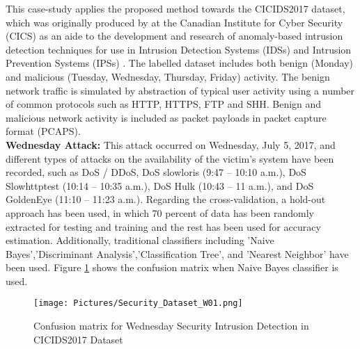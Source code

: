 \documentclass{article}
\begin{document}
This case-study applies the proposed method towards the CICIDS2017 dataset, which was originally produced by \cite{securitydataset} at the Canadian Institute for Cyber Security (CICS) as an aide to the development and research of anomaly-based intrusion detection techniques for use in Intrusion Detection Systems (IDSs) and Intrusion Prevention Systems (IPSs) \cite{datasetanalysis}.
The labelled dataset includes both benign (Monday) and malicious (Tuesday, Wednesday, Thursday, Friday) activity. The benign network traffic is simulated by abstraction of typical user activity using a number of common protocols such as HTTP, HTTPS, FTP and SHH. Benign and malicious network activity is included as packet payloads in packet capture format (PCAPS).
\\
\textbf{Wednesday Attack:} This attack occurred on Wednesday, July 5, 2017, and different types of attacks on the availability of the victim's system have been recorded, such as DoS / DDoS, DoS slowloris (9:47 – 10:10 a.m.), DoS Slowhttptest (10:14 – 10:35 a.m.), DoS Hulk (10:43 – 11 a.m.), and DoS GoldenEye (11:10 – 11:23 a.m.). Regarding the cross-validation, a hold-out approach has been used, in which 70 percent of data has been randomly extracted for testing and training and the rest has been used for accuracy estimation. Additionally, traditional classifiers including 'Naive Bayes','Discriminant Analysis','Classification Tree', and 'Nearest Neighbor' have been used. Figure \ref{fig_W01} shows the confusion matrix when Naive Bayes classifier is used. 

\begin{figure}
\centering
\texttt{[image: Pictures/Security\_Dataset\_W01.png]}
\caption{Confusion matrix for Wednesday Security Intrusion Detection in CICIDS2017 Dataset} \label{fig_W01}
\end{figure}

\begin{comment}
Figure \ref{fig_W02} shows a sample result of six statistical measures (one PDF-based and five ECDF-based) vs. the classifier's accuracy. It is expected to have low distance (from the ECDF measures) when the accuracy is high and vice versa. As can be seen in \ref{fig_W02}, the Kuiper distance measure performs better. However, these results were derived from only one iteration of the random hold-out process. Therefore, the process should be iterated over several times and the performance of each distance measure on average should be reviewed.

\begin{figure}
\texttt{[image: Pictures/Security\_Dataset\_W02v2.png]}
\caption{Sample statistical distance measures vs. accuracy} \label{fig_W02}
\end{figure}
\end{comment}
\end{document}
